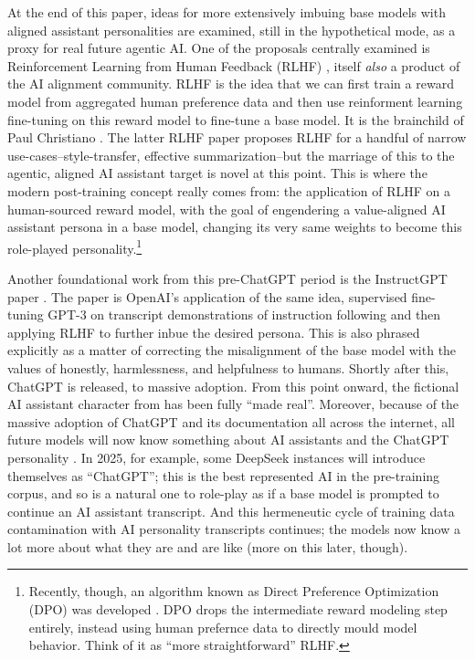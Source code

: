 At the end of this paper, ideas for more extensively imbuing base models with
aligned assistant personalities are examined, still in the hypothetical mode,
as a proxy for real future agentic AI. One of the proposals centrally examined
is Reinforcement Learning from Human Feedback (RLHF)
\cite{christiano2017human,bai2022training,ziegler2019human}, itself \emph{also}
a product of the AI alignment community. RLHF is the idea that we can first
train a reward model from aggregated human preference data and then use
reinforment learning fine-tuning on this reward model to fine-tune a base
model. It is the brainchild of Paul Christiano \cite{christiano2017human}. The
latter RLHF paper proposes RLHF for a handful of narrow
use-cases--style-transfer, effective summarization--but the marriage of this to
the agentic, aligned AI assistant target is novel at this point. This is where
the modern post-training concept really comes from: the application of RLHF on
a human-sourced reward model, with the goal of engendering a value-aligned AI
assistant persona in a base model, changing its very same weights to become
this role-played personality.\footnote{Recently, though, an algorithm known as
Direct Preference Optimization (DPO) was developed \cite{rafailov2024dpo}. DPO
drops the intermediate reward modeling step entirely, instead using human
prefernce data to directly mould model behavior. Think of it as ``more
straightforward'' RLHF. }

Another foundational work from this pre-ChatGPT period is the InstructGPT paper
\cite{ouyang2022feedback}. The paper is OpenAI's application of the same idea,
supervised fine-tuning GPT-3 on transcript demonstrations of instruction
following and then applying RLHF to further inbue the desired persona. This is
also phrased explicitly as a matter of correcting the misalignment of the base
model with the values of honestly, harmlessness, and helpfulness to humans.
Shortly after this, ChatGPT is released, to massive adoption. From this point
onward, the fictional AI assistant character from \cite{askell2021assistant}
has been fully ``made real''. Moreover, because of the massive adoption of
ChatGPT and its documentation all across the internet, all future models will
now know something about AI assistants and the ChatGPT personality
\cite{nostalgebraist2025void}. In 2025, for example, some DeepSeek instances
\cite{deepseekai2025deepseek} will introduce themselves as ``ChatGPT''; this is
the best represented AI in the pre-training corpus, and so is a natural one to
role-play as if a base model is prompted to continue an AI assistant
transcript. And this hermeneutic cycle of training data contamination with AI
personality transcripts continues; the models now know a lot more about what
they are and are like (more on this later, though).


